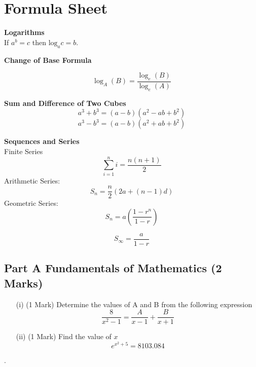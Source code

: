 \documentclass[11pt]{article} %
\begin{document}

\newpage


\LARGE
\section*{Formula Sheet}

\noindent \textbf{Logarithms}\\
	If $a^b = c$ then $\mbox{log}_a c = b$.
	
\medskip

\noindent \textbf{Change of Base Formula}

\[ \log_A(B) = \frac{ \log_e(B) }{ \log_e(A) }  \]


\noindent \textbf{Sum and Difference of Two Cubes}
	\[ a^3 + b^3 = (a-b)(a^2 - ab + b^2)\]
	\[ a^3 - b^3 = (a-b)(a^2 + ab + b^2)\]
	\medskip
	
\noindent \textbf{Sequences and Series}\\
	Finite Series
	\[ \sum_{i=1}^{n} i = \frac{n(n+1)}{2}\]
	\medskip
	Arithmetic Series:
	\[ S_n = \frac{n}{2} \left(2a + (n-1) d \right)\]
	\medskip
	Geometric Series:
	\[ S_n = a\left(\frac{1-r^n}{1-r}\right)\]
	
	\[ S_\infty = \frac{a}{1-r}\]


	
	

\newpage

\subsection*{Part A Fundamentals of Mathematics (2 Marks) } %

\begin{itemize}
	
	\item[(i)] (1 Mark) Determine the values of A and B from the following expression
	\[  \frac{8}{x^2-1} = \frac{A}{x-1} + \frac{B}{x+1}\]
	\vspace{2.5cm}
	
%


		
	\item[(ii)] (1 Mark) Find the value of $x$
	{ \huge	\[e^{x^2+5} = 8103.084 \]
}
\end{itemize}
\newpage
.
\newpage
\end{document}

